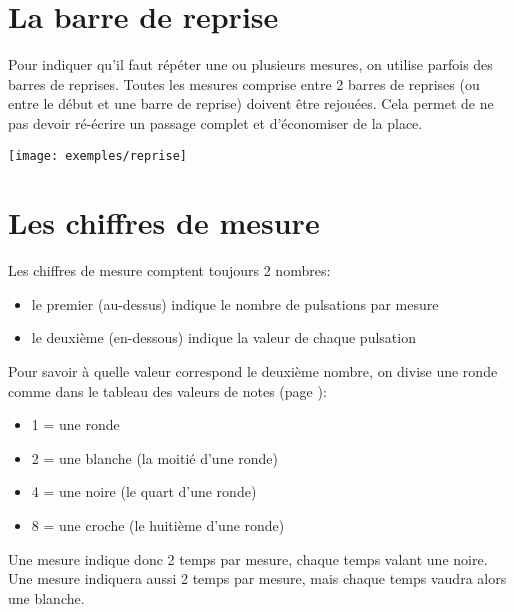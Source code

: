 
\section{La barre de reprise}
Pour indiquer qu'il faut répéter une ou plusieurs mesures, on utilise parfois des barres de reprises. Toutes les mesures comprise entre 2 barres de reprises (ou entre le début et une barre de reprise) doivent être rejouées. Cela permet de ne pas devoir ré-écrire un passage complet et d'économiser de la place.

\texttt{[image: exemples/reprise]}

\section{Les chiffres de mesure}
Les chiffres de mesure comptent toujours 2 nombres:
\begin{itemize}
\item le premier (au-dessus) indique le nombre de pulsations par mesure
\item le deuxième (en-dessous) indique la valeur de chaque pulsation
\end{itemize}


Pour savoir à quelle valeur correspond le deuxième nombre, on divise une ronde comme dans le tableau des valeurs de notes (page \pageref{tableaunotes}):
\begin{itemize}
\item 1 = une ronde
\item 2 = une blanche (la moitié d'une ronde)
\item 4 = une noire (le quart d'une ronde)
\item 8 = une croche (le huitième d'une ronde)
\end{itemize}
Une mesure  indique donc 2 temps par mesure, chaque temps valant une noire. Une mesure  indiquera aussi 2 temps par mesure, mais chaque temps vaudra alors une blanche.

